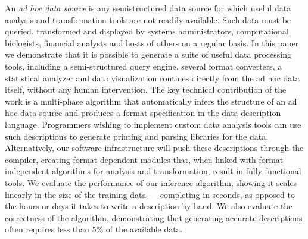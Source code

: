 An {\em ad hoc data source} is any semistructured data source for
which useful data analysis and transformation tools are not 
readily available.  Such data must be queried, transformed and displayed by
systems administrators, computational biologists, financial analysts
and hosts of others on a regular basis.  
In this paper, we demonstrate that it is possible to generate a suite
of useful data processing tools, including a semi-structured query
engine, several format converters, a statistical analyzer and data
visualization routines directly from the ad hoc data itself, 
without any human intervention.  
The key technical contribution of the work is a multi-phase algorithm
that automatically infers the structure of an ad hoc data source and
produces a format specification in the \pads{} data description
language.  
Programmers wishing to implement custom data analysis tools
can use such descriptions to generate printing and parsing libraries
for the data.  Alternatively,  our software infrastructure will
push these descriptions through the \pads{} compiler, creating
format-dependent modules that, when linked with format-independent
algorithms for analysis and transformation, result in
fully functional tools.  We evaluate the performance of
our inference algorithm, showing it scales linearly
in the size of the training data --- completing in seconds, as opposed
to the hours or days it takes to write a description by hand.
We also evaluate the correctness of the algorithm, demonstrating that 
generating accurate descriptions often requires less than 5\% of the
available data.